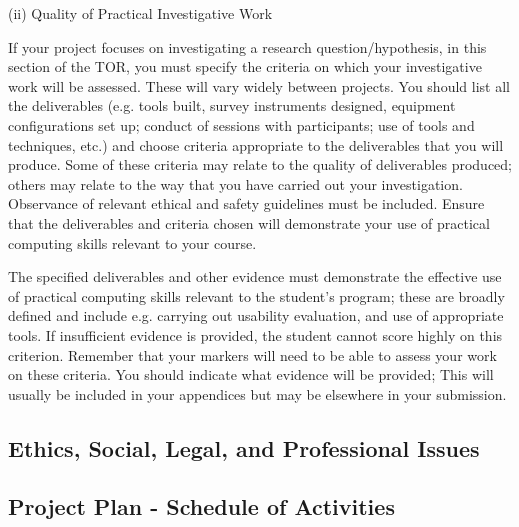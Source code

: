 \documentclass[../CHEFCookingHelperForEveryonesFridge.tex]{subfiles}
\begin{document}
{    (ii)	Quality of Practical Investigative Work

    If your project focuses on investigating a research question/hypothesis, in this section of the TOR, you must specify the criteria
    on which your investigative work will be assessed. These will vary widely between projects. You should list all the deliverables
    (e.g. tools built, survey instruments designed, equipment configurations set up; conduct of sessions with participants; use of tools and techniques, etc.)
    and choose criteria appropriate to the deliverables that you will produce. Some of these criteria may relate to the quality of deliverables produced;
    others may relate to the way that you have carried out your investigation. Observance of relevant ethical and safety guidelines must be included.
    Ensure that the deliverables and criteria chosen will demonstrate your use of practical computing skills relevant to your course.

    The specified deliverables and other evidence must demonstrate the effective use of practical computing skills relevant to the student's program;
    these are broadly defined and include e.g. carrying out usability evaluation, and use of appropriate tools. If insufficient evidence is provided,
    the student cannot score highly on this criterion.
    Remember that your markers will need to be able to assess your work on these criteria. You should indicate what evidence will be provided;
    This will usually be included in your appendices but may be elsewhere in your submission.
}

\subsection{Ethics, Social, Legal, and Professional Issues}


\subsection{Project Plan - Schedule of Activities}
\end{document}
